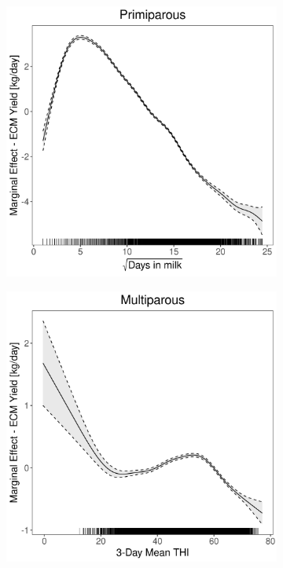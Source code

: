 \begin{figure}[H]
\begin{subfigure}[b]{0.45\textwidth}
    \end{subfigure}
    \hspace{0.05\textwidth} %
    \begin{subfigure}[b]{0.45\textwidth}
        \centering
        \includegraphics[width=\textwidth]{thesis/figures/models/ecm/after2010/je_ecm_after2010/je_ecm_after2010_marginal_dim_milk_primi.png}
    \end{subfigure}
    \begin{subfigure}[b]{0.45\textwidth}
        \centering
        \includegraphics[width=\textwidth]{thesis/figures/models/ecm/after2010/je_ecm_after2010/je_ecm_after2010_marginal_thi_milk_multi.png}

\end{subfigure}
\end{figure}
